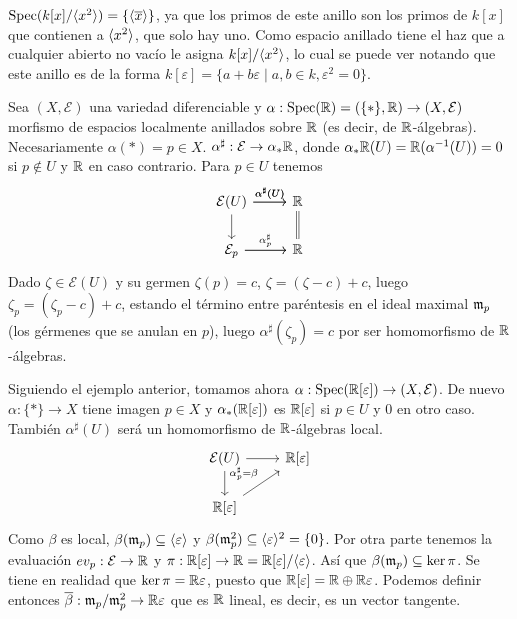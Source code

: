 \documentclass[GA.tex]{subfiles}
\begin{document}
\begin{ej}
$\operatorname{Spec}(k[x]/\langle{x^2}\rangle)=\{\langle{\overline{x}}\rangle\}$, ya que los primos de este anillo son los primos de $k[x]$ que contienen a $\langle{x^2}\rangle$, que solo hay uno.  Como espacio anillado tiene el haz que a cualquier abierto no vacío le asigna $k[x]/\langle{x^2}\rangle$, lo cual se puede ver notando que este anillo es de la forma $k[\varepsilon]=\{a+b\varepsilon\mid a,b\in k, \varepsilon^2=0\}$.
\end{ej}

\begin{ej}
Sea $(X,\mathcal{E})$ una variedad diferenciable y $\alpha:\operatorname{Spec}(\mathbb{R})=(\{*\},\mathbb{R})\to (X,\mathcal{E})$ morfismo de espacios localmente anillados sobre $\mathbb{R}$ (es decir, de $\mathbb{R}$-álgebras). Necesariamente $\alpha(*)=p\in X$. $\alpha^{\sharp}:\mathcal{E}\to\alpha_*\mathbb{R}$, donde $\alpha_*\mathbb{R}(U)=\mathbb{R}(\alpha^{-1}(U))=0$ si $p\notin U$ y $\mathbb{R}$ en caso contrario. Para $p\in U$ tenemos
\[
\begin{tikzcd}
\mathcal{E}(U)\arrow[r, "\alpha^{\sharp}(U)"]\arrow[r, "\alpha^{\sharp}(U)"]\arrow[d]& \R\arrow[d, equals]\\
\mathcal{E}_p\arrow[r, "\alpha^{\sharp}_p"]\arrow[r] & \R
\end{tikzcd}
\]
Dado $\zeta\in \mathcal{E}(U)$ y su germen $\zeta(p)=c$, $\zeta=(\zeta-c)+c$, luego $\zeta_p=(\zeta_p-c)+c$, estando el término entre paréntesis en el ideal maximal ${\mathfrak{m}}_p$ (los gérmenes que se anulan en $p$), luego $\alpha^{\sharp}(\zeta_p)=c$ por ser homomorfismo de $\mathbb{R}$-álgebras. 
\end{ej}

\begin{ej}
Siguiendo el ejemplo anterior, tomamos ahora $\alpha:\operatorname{Spec}(\mathbb{R}[\varepsilon])\to (X,\mathcal{E})$. De nuevo $\alpha:\{*\}\to X$ tiene imagen $p\in X$ y $\alpha_*(\mathbb{R}[\varepsilon])$ es $\mathbb{R}[\varepsilon]$ si $p\in U$ y 0 en otro caso. También $\alpha^{\sharp}(U)$ será un homomorfismo de $\mathbb{R}$-álgebras local. 
\[
\begin{tikzcd}
\mathcal{E}(U)\arrow[r] \arrow[d] &\R[\varepsilon]\\
\R[\varepsilon]\arrow[ur, "\alpha^{\sharp}_p=\beta"]&
\end{tikzcd}
\]
Como $\beta$ es local, $\beta({\mathfrak{m}}_p)\subseteq\langle{\varepsilon}\rangle$ y $\beta({\mathfrak{m}}^2_p)\subseteq\langle{\varepsilon}\rangle^2=\{0\}$. Por otra parte tenemos la evaluación $ev_p:\mathcal{E}\to \mathbb{R}$ y $\pi:\mathbb{R}[\varepsilon]\to \mathbb{R}=\mathbb{R}[\varepsilon]/\langle{\varepsilon}\rangle$. Así que $\beta({\mathfrak{m}}_p)\subseteq\ker\pi$. Se tiene en realidad que $\ker\pi=\mathbb{R}\varepsilon$, puesto que $\mathbb{R}[\varepsilon]=\mathbb{R}\oplus\mathbb{R}\varepsilon$. Podemos definir entonces $\overline{\beta}:{\mathfrak{m}}_p/{\mathfrak{m}}^2_p\to\mathbb{R}\varepsilon$ que es $\mathbb{R}$ lineal, es decir, es un vector tangente. 
\end{ej}
\end{document}
